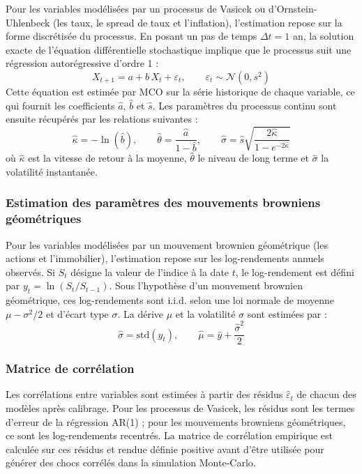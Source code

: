 Pour les variables modélisées par un processus de Vasicek ou d'Ornstein-Uhlenbeck (les taux, le spread de taux et l'inflation), l'estimation repose sur la forme discrétisée du processus. En posant un pas de temps $\Delta t = 1$ an, la solution exacte de l'équation différentielle stochastique implique que le processus suit une régression autorégressive d'ordre 1 :
\begin{equation}
    X_{t+1} = a + b \, X_t + \varepsilon_t, \qquad \varepsilon_t \sim \mathcal{N}(0, s^2)
\end{equation}
Cette équation est estimée par MCO sur la série historique de chaque variable, ce qui fournit les coefficients $\hat{a}$, $\hat{b}$ et $\hat{s}$. Les paramètres du processus continu sont ensuite récupérés par les relations suivantes :
\begin{equation}
    \hat{\kappa} = -\ln(\hat{b}), \qquad
    \hat{\theta} = \frac{\hat{a}}{1 - \hat{b}}, \qquad
    \hat{\sigma} = \hat{s} \sqrt{\frac{2\hat{\kappa}}{1 - e^{-2\hat{\kappa}}}}
\end{equation}
où $\hat{\kappa}$ est la vitesse de retour à la moyenne, $\hat{\theta}$ le niveau de long terme et $\hat{\sigma}$ la volatilité instantanée.

\subsubsection{Estimation des paramètres des mouvements browniens géométriques}

Pour les variables modélisées par un mouvement brownien géométrique (les actions et l'immobilier), l'estimation repose sur les log-rendements annuels observés. Si $S_t$ désigne la valeur de l'indice à la date $t$, le log-rendement est défini par $y_t = \ln(S_t / S_{t-1})$. Sous l'hypothèse d'un mouvement brownien géométrique, ces log-rendements sont i.i.d. selon une loi normale de moyenne $\mu - \sigma^2/2$ et d'écart type $\sigma$. La dérive $\mu$ et la volatilité $\sigma$ sont estimées par :
\begin{equation}
    \hat{\sigma} = \text{std}(y_t), \qquad \hat{\mu} = \bar{y} + \frac{\hat{\sigma}^2}{2}
\end{equation}

\subsubsection{Matrice de corrélation}

Les corrélations entre variables sont estimées à partir des résidus $\hat{\varepsilon}_t$ de chacun des modèles après calibrage. Pour les processus de Vasicek, les résidus sont les termes d'erreur de la régression AR(1) ; pour les mouvements browniens géométriques, ce sont les log-rendements recentrés. La matrice de corrélation empirique est calculée sur ces résidus et rendue définie positive avant d'être utilisée pour générer des chocs corrélés dans la simulation Monte-Carlo.


